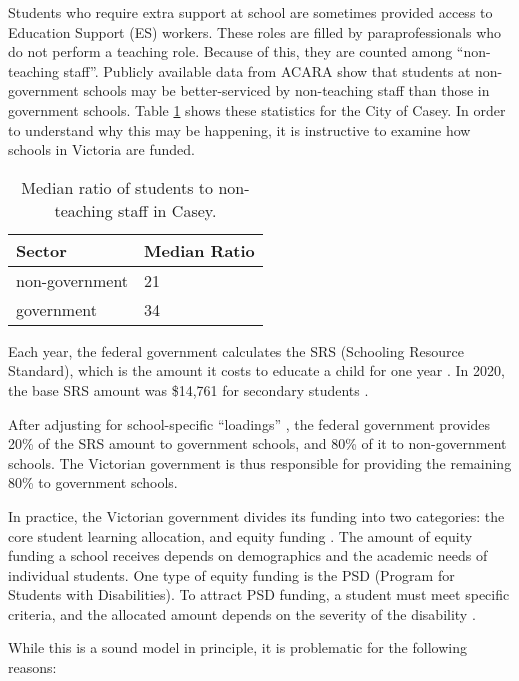 \documentclass[11pt, a4paper]{article}
\begin{document}
    Students who require extra support at school are sometimes provided access to Education Support (ES) workers. These roles are filled by paraprofessionals who do not perform a teaching role. Because of this, they are counted among ``non-teaching staff''. Publicly available data from ACARA \parencite{acara_profiles} show that students at non-government schools may be better-serviced by non-teaching staff than those in government schools. Table \ref{es_staff_ratios} shows these statistics for the City of Casey. In order to understand why this may be happening, it is instructive to examine how schools in Victoria are funded.

    \begin{table}[!ht]
        \centering
        \caption{Median ratio of students to non-teaching staff in Casey.}
        \begin{tabular}{|l|l|}
            \hline
            Sector          & Median Ratio  \\ \hline
            non-government  & 21            \\ \hline
            government      & 34            \\ \hline
        \end{tabular}
        \label{es_staff_ratios}
    \end{table}

    Each year, the federal government calculates the SRS (Schooling Resource Standard), which is the amount it costs to educate a child for one year \parencite{srs_background}. In 2020, the base SRS amount was \$14,761 for secondary students \parencite{srs_2020}.

    After adjusting for school-specific ``loadings'' \parencite{srs_2020}, the federal government provides 20\% of the SRS amount to government schools, and 80\% of it to non-government schools. The Victorian government is thus responsible for providing the remaining 80\% to government schools.

    In practice, the Victorian government divides its funding into two categories: the core student learning allocation, and equity funding \parencite{srp_vic}. The amount of equity funding a school receives depends on demographics and the academic needs of individual students. One type of equity funding is the PSD (Program for Students with Disabilities). To attract PSD funding, a student must meet specific criteria, and the allocated amount depends on the severity of the disability \parencite{psd_guidelines}.

    While this is a sound model in principle, it is problematic for the following reasons:
\end{document}
